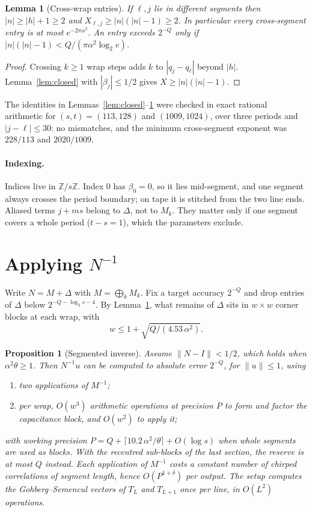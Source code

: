 \documentclass[11pt]{article}
\newtheorem{lemma}{Lemma}
\newtheorem{proposition}{Proposition}
\theoremstyle{remark}\newtheorem*{remark}{Remark}
\begin{document}
\begin{lemma}[Cross-wrap entries]\label{lem:cross}
If $\ell,j$ lie in different segments then $|n|\ge|h|+1\ge2$ and
$X_{\ell,j}\ge|n|(|n|-1)\ge2$. In particular every cross-segment entry is at most
$e^{-2\pi\alpha^2}$. An entry exceeds $2^{-Q}$ only if $|n|(|n|-1)<Q/(\pi\alpha^2\log_2e)$.
\end{lemma}
\begin{proof}
Crossing $k\ge1$ wrap steps adds $k$ to $|q_j-q_\ell|$ beyond $|h|$. Lemma~\ref{lem:closed}
with $|\beta_j|\le1/2$ gives $X\ge|n|(|n|-1)$.
\end{proof}

The identities in Lemmas~\ref{lem:closed}--\ref{lem:cross} were checked in exact rational
arithmetic for $(s,t)=(113,128)$ and $(1009,1024)$, over three periods and $|j-\ell|\le30$:
no mismatches, and the minimum cross-segment exponent was $228/113$ and $2020/1009$.

\paragraph{Indexing.} Indices live in $\mathbb Z/s\mathbb Z$. Index $0$ has $\beta_0=0$, so it lies mid-segment, and one segment always crosses the period boundary; on tape it is stitched from the two line ends. Aliased terms $j+ms$ belong to $\Delta$, not to $M_k$. They matter only if one segment covers a whole period ($t-s=1$), which the parameters exclude.

\section{Applying $N^{-1}$}

Write $N=M+\Delta$ with $M=\bigoplus_kM_k$. Fix a target accuracy $2^{-Q}$ and drop
entries of $\Delta$ below $2^{-Q-\log_2 s-4}$. By Lemma~\ref{lem:cross}, what remains of
$\Delta$ sits in $w\times w$ corner blocks at each wrap, with
\[
 w\le1+\sqrt{Q/(4.53\,\alpha^2)} .
\]

\begin{proposition}[Segmented inverse]\label{prop:inverse}
Assume $\|N-I\|<1/2$, which holds when $\alpha^2\theta\ge1$. Then $N^{-1}u$ can be computed
to absolute error $2^{-Q}$, for $\|u\|\le1$, using
\begin{enumerate}
\item two applications of $M^{-1}$;
\item per wrap, $O(w^3)$ arithmetic operations at precision $P$ to form and factor the
capacitance block, and $O(w^2)$ to apply it;
\end{enumerate}
with working precision $P=Q+\lceil10.2\,\alpha^2/\theta\rceil+O(\log s)$ when whole segments are used as blocks. With the recentred sub-blocks of the last section, the reserve is at most $Q$ instead.
Each application of $M^{-1}$ costs a constant number of chirped correlations of segment
length, hence $O(P^{1+\delta})$ per output. The setup computes the Gohberg--Semencul
vectors of $T_L$ and $T_{L+1}$ once per line, in $O(L^2)$ operations.
\end{proposition}
\end{document}
